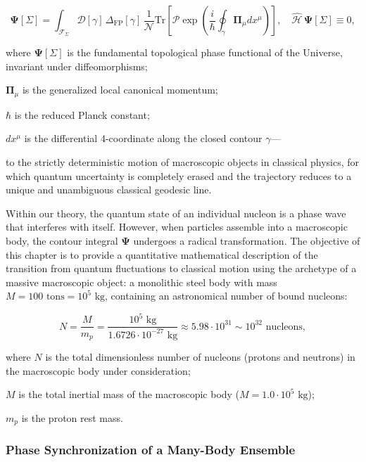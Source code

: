 \documentclass[11pt,a4paper]{article}
\theoremstyle{definition}
\begin{document}
\begin{equation}\label{eq:5.1}\tag{5.1}
\mathbf{\Psi}[\Sigma] = \int_{\mathcal{F}_\Sigma} \mathcal{D}[\gamma] \, \Delta_{\text{FP}}[\gamma] \, \frac{1}{\mathcal{N}} \text{Tr}\left[ \mathcal{P}\exp\left( \frac{i}{\hbar} \oint_\gamma \mathbf{\Pi}_\mu dx^\mu \right) \right], \quad \hat{\mathcal{H}}\,\mathbf{\Psi}[\Sigma] \equiv 0,
\end{equation}

where $\mathbf{\Psi}[\Sigma]$ is the fundamental topological phase functional of the Universe, invariant under diffeomorphisms;  

$\mathbf{\Pi}_\mu$ is the generalized local canonical momentum;  

$\hbar$ is the reduced Planck constant;  

$dx^\mu$ is the differential 4-coordinate along the closed contour $\gamma$---

to the strictly deterministic motion of macroscopic objects in classical physics, for which quantum uncertainty is completely erased and the trajectory reduces to a unique and unambiguous classical geodesic line.

Within our theory, the quantum state of an individual nucleon is a phase wave that interferes with itself. However, when particles assemble into a macroscopic body, the contour integral $\mathbf{\Psi}$ undergoes a radical transformation. The objective of this chapter is to provide a quantitative mathematical description of the transition from quantum fluctuations to classical motion using the archetype of a massive macroscopic object: a monolithic steel body with mass $M = 100\text{ tons} = 10^5\text{ kg}$, containing an astronomical number of bound nucleons:

\begin{equation}\label{eq:5.2}\tag{5.2}
N = \frac{M}{m_p} = \frac{10^5\text{ kg}}{1.6726 \cdot 10^{-27}\text{ kg}} \approx 5.98 \cdot 10^{31} \sim 10^{32}\text{ nucleons},
\end{equation}

where $N$ is the total dimensionless number of nucleons (protons and neutrons) in the macroscopic body under consideration;  

$M$ is the total inertial mass of the macroscopic body ($M = 1.0 \cdot 10^5\text{ kg}$);  

$m_p$ is the proton rest mass.

\subsubsection{Phase Synchronization of a Many-Body Ensemble}\label{sec:5.1.2}
\end{document}
